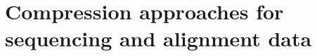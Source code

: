 \documentclass[12pt]{cmuthesis}
\begin{document}
\part{Compression approaches for sequencing and alignment data}
\label{part:compress}


%
%







%
\end{document}
